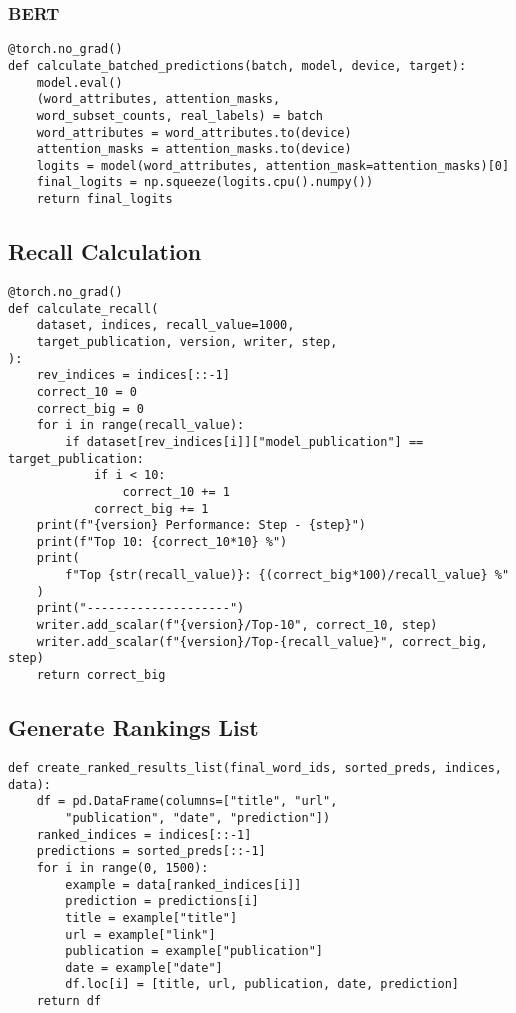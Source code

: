 \subsubsection{BERT}
\begin{verbatim}
@torch.no_grad()
def calculate_batched_predictions(batch, model, device, target):
    model.eval()
    (word_attributes, attention_masks, 
    word_subset_counts, real_labels) = batch
    word_attributes = word_attributes.to(device)
    attention_masks = attention_masks.to(device)
    logits = model(word_attributes, attention_mask=attention_masks)[0]
    final_logits = np.squeeze(logits.cpu().numpy())
    return final_logits
\end{verbatim}

\subsection{Recall Calculation}
\begin{verbatim}
@torch.no_grad()
def calculate_recall(
    dataset, indices, recall_value=1000, 
    target_publication, version, writer, step,
):
    rev_indices = indices[::-1]
    correct_10 = 0
    correct_big = 0
    for i in range(recall_value):
        if dataset[rev_indices[i]]["model_publication"] == target_publication:
            if i < 10:
                correct_10 += 1
            correct_big += 1
    print(f"{version} Performance: Step - {step}")
    print(f"Top 10: {correct_10*10} %")
    print(
        f"Top {str(recall_value)}: {(correct_big*100)/recall_value} %"
    )
    print("--------------------")
    writer.add_scalar(f"{version}/Top-10", correct_10, step)
    writer.add_scalar(f"{version}/Top-{recall_value}", correct_big, step)
    return correct_big
\end{verbatim}

\subsection{Generate Rankings List}
\begin{verbatim}
def create_ranked_results_list(final_word_ids, sorted_preds, indices, data):
    df = pd.DataFrame(columns=["title", "url", 
    	"publication", "date", "prediction"])
    ranked_indices = indices[::-1]
    predictions = sorted_preds[::-1]
    for i in range(0, 1500):
        example = data[ranked_indices[i]]
        prediction = predictions[i]
        title = example["title"]
        url = example["link"]
        publication = example["publication"]
        date = example["date"]
        df.loc[i] = [title, url, publication, date, prediction]
    return df
\end{verbatim}